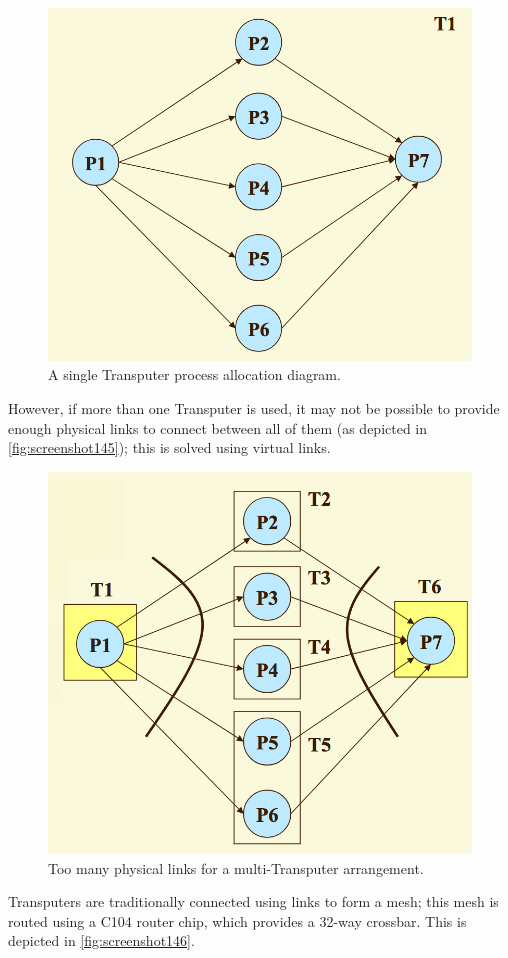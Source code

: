 \begin{figure}
\centering
\includegraphics[width=0.7\linewidth]{figures/screenshot144}
\caption{A single Transputer process allocation diagram.}
\label{fig:screenshot144}
\end{figure}

However, if more than one Transputer is used, it may not be possible to provide enough physical links to connect between all of them (as depicted in \autoref{fig:screenshot145}); this is solved using virtual links.

\begin{figure}
\centering
\includegraphics[width=0.7\linewidth]{figures/screenshot145}
\caption{Too many physical links for a multi-Transputer arrangement.}
\label{fig:screenshot145}
\end{figure}

Transputers are traditionally connected using links to form a mesh; this mesh is routed using a C104 router chip, which provides a 32-way crossbar. This is depicted in \autoref{fig:screenshot146}.

